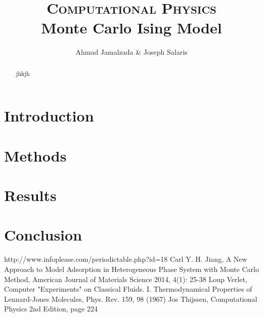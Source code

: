 \documentclass[11pt]{article}
\author{Ahmad Jamalzada \& Joseph Salaris}
\title{\textsc{\Huge Computational Physics}\\Monte Carlo Ising Model}
\begin{document}
\maketitle
\begin{abstract}
jhkjh
\end{abstract}
\section{Introduction}


\section{Methods}


\section{Results}


\section{Conclusion}



\begin{thebibliography}{x}
http://www.infoplease.com/periodictable.php?id=18
Carl Y. H. Jiang, A New Approach to Model Adsorption in Heterogeneous
Phase System with Monte Carlo Method, American Journal of Materials Science 2014, 4(1): 25-38
Loup Verlet, Computer "Experiments" on Classical Fluids. I. Thermodynamical Properties of Lennard-Jones Molecules, Phys. Rev. 159, 98 (1967)
Jos Thijssen, Computational Physics 2nd Edition, page 224
\end{thebibliography}
\end{document}
